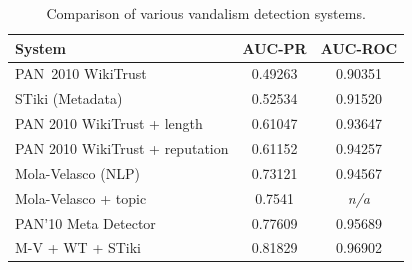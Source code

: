 \begin{table}[tbhp]
    \begin{center}
        \begin{tabular}{|l|c|c|}
\hline
\textbf{System} & \textbf{AUC-PR} & \textbf{AUC-ROC} \\
\hline
\hline
PAN~2010 WikiTrust~\cite{Potthast2010b} & 0.49263 & 0.90351 \\
STiki (Metadata)~\cite{Adler2011a} & 0.52534 & 0.91520 \\
PAN 2010 WikiTrust + length~\cite{Adler2011a} & 0.61047 & 0.93647 \\
PAN 2010 WikiTrust + reputation & 0.61152 & 0.94257 \\
Mola-Velasco (NLP)~\cite{Adler2011a} & 0.73121 & 0.94567 \\
Mola-Velasco + topic~\cite{Mola2011} & 0.7541 & \textit{n/a} \\
PAN'10 Meta Detector~\cite{Potthast2010b} & 0.77609 & 0.95689 \\
M-V + WT + STiki~\cite{Adler2011a} & 0.81829 & 0.96902 \\
\hline
        \end{tabular}
    \end{center}
    \caption{Comparison of various vandalism detection systems.}
\end{table}
